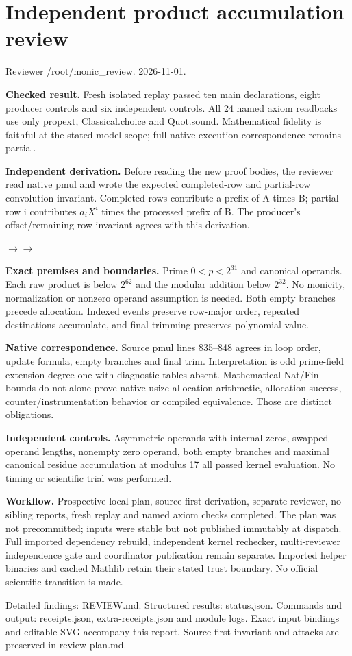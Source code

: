 \documentclass[10pt]{article}
\begin{document}
\section*{Independent product accumulation review}
Reviewer /root/monic\_review. 2026-11-01.

\textbf{Checked result.} Fresh isolated replay passed ten main declarations, eight producer controls and six independent controls. All 24 named axiom readbacks use only propext, Classical.choice and Quot.sound. Mathematical fidelity is faithful at the stated model scope; full native execution correspondence remains partial.

\textbf{Independent derivation.} Before reading the new proof bodies, the reviewer read native pmul and wrote the expected completed-row and partial-row convolution invariant. Completed rows contribute a prefix of A times B; partial row i contributes $a_iX^i$ times the processed prefix of B. The producer's offset/remaining-row invariant agrees with this derivation.

\begin{center}\quad$\longrightarrow$\quad{}\quad$\longrightarrow$\quad{}\end{center}

\textbf{Exact premises and boundaries.} Prime $0<p<2^{31}$ and canonical operands. Each raw product is below $2^{62}$ and the modular addition below $2^{32}$. No monicity, normalization or nonzero operand assumption is needed. Both empty branches precede allocation. Indexed events preserve row-major order, repeated destinations accumulate, and final trimming preserves polynomial value.

\textbf{Native correspondence.} Source pmul lines 835--848 agrees in loop order, update formula, empty branches and final trim. Interpretation is odd prime-field extension degree one with diagnostic tables absent. Mathematical Nat/Fin bounds do not alone prove native usize allocation arithmetic, allocation success, counter/instrumentation behavior or compiled equivalence. Those are distinct obligations.

\textbf{Independent controls.} Asymmetric operands with internal zeros, swapped operand lengths, nonempty zero operand, both empty branches and maximal canonical residue accumulation at modulus 17 all passed kernel evaluation. No timing or scientific trial was performed.

\textbf{Workflow.} Prospective local plan, source-first derivation, separate reviewer, no sibling reports, fresh replay and named axiom checks completed. The plan was not precommitted; inputs were stable but not published immutably at dispatch. Full imported dependency rebuild, independent kernel rechecker, multi-reviewer independence gate and coordinator publication remain separate. Imported helper binaries and cached Mathlib retain their stated trust boundary. No official scientific transition is made.

Detailed findings: REVIEW.md. Structured results: status.json. Commands and output: receipts.json, extra-receipts.json and module logs. Exact input bindings and editable SVG accompany this report. Source-first invariant and attacks are preserved in review-plan.md.
\end{document}
